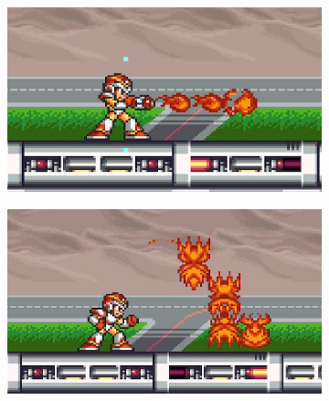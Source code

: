 \begin{figure}[htp]
	\centering
	\begin{subfigure}{0.35\linewidth}
		\centering
		\includegraphics[width=\linewidth]{figures/X1/weapons/Fire_wave_1.jpg}
	\end{subfigure}
	\begin{subfigure}{0.35\linewidth}
		\centering
		\includegraphics[width=\linewidth]{figures/X1/weapons/Fire_wave_3.jpg}
	\end{subfigure}
\end{figure}
